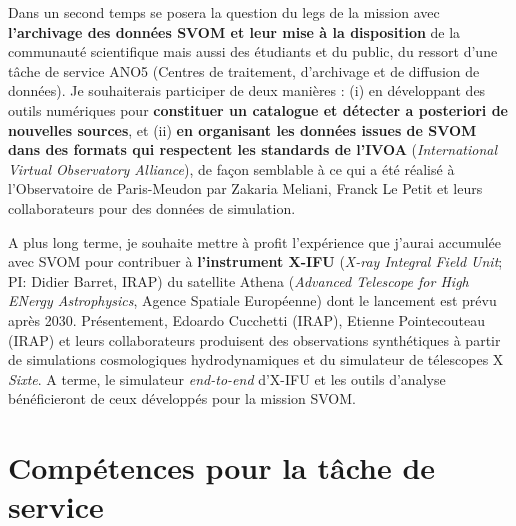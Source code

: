 \documentclass[11pt,onecolumn]{article}
\begin{document}
Dans un second temps se posera la question du legs de la mission avec \textbf{l'archivage des données SVOM et leur mise à la disposition} de la communauté scientifique mais aussi des étudiants et du public, du ressort d'une t\^{a}che de service ANO5 (Centres de traitement, d'archivage et de diffusion de données). Je souhaiterais participer de deux manières : (i) en développant des outils numériques pour \textbf{constituer un catalogue et détecter a posteriori de nouvelles sources}, et (ii) \textbf{en organisant les données issues de SVOM dans des formats qui respectent les standards de l'IVOA} (\textit{International Virtual Observatory Alliance}), de fa\c con semblable à ce qui a été réalisé à l'Observatoire de Paris-Meudon par Zakaria Meliani, Franck Le Petit et leurs collaborateurs pour des données de simulation.

A plus long terme, je souhaite mettre à profit l'expérience que j'aurai accumulée avec SVOM pour contribuer à \textbf{l'instrument X-IFU} (\textit{X-ray Integral Field Unit}; PI: Didier Barret, IRAP) du satellite Athena (\textit{Advanced Telescope for High ENergy Astrophysics}, Agence Spatiale Européenne) dont le lancement est prévu après 2030. Présentement, Edoardo Cucchetti (IRAP), Etienne Pointecouteau (IRAP) et leurs collaborateurs produisent des observations synthétiques à partir de simulations cosmologiques hydrodynamiques et du simulateur de télescopes X \textit{Sixte}. A terme, le simulateur \textit{end-to-end} d'X-IFU et les outils d'analyse bénéficieront de ceux développés pour la mission SVOM.

%

\section{Compétences pour la tâche de service}
\end{document}
